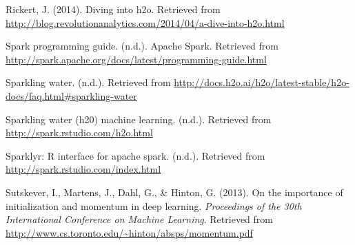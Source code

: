 \documentclass[12pt,twoside]{amherstthesis}
\begin{document}
  \hypertarget{ref-JVM}{}
  Rickert, J. (2014). Diving into h2o. Retrieved from
  \url{http://blog.revolutionanalytics.com/2014/04/a-dive-into-h2o.html}
  
  \hypertarget{ref-RDD}{}
  Spark programming guide. (n.d.). Apache Spark. Retrieved from
  \url{http://spark.apache.org/docs/latest/programming-guide.html}
  
  \hypertarget{ref-Sparklingh2oDoc}{}
  Sparkling water. (n.d.). Retrieved from
  \url{http://docs.h2o.ai/h2o/latest-stable/h2o-docs/faq.html\#sparkling-water}
  
  \hypertarget{ref-SparklingWaterML}{}
  Sparkling water (h20) machine learning. (n.d.). Retrieved from
  \url{http://spark.rstudio.com/h2o.html}
  
  \hypertarget{ref-SparklingWaterOverview}{}
  Sparklyr: R interface for apache spark. (n.d.). Retrieved from
  \url{http://spark.rstudio.com/index.html}
  
  \hypertarget{ref-momentum}{}
  Sutskever, I., Martens, J., Dahl, G., \& Hinton, G. (2013). On the
  importance of initialization and momentum in deep learning.
  \emph{Proceedings of the 30th International Conference on Machine
  Learning}. Retrieved from
  \url{http://www.cs.toronto.edu/~hinton/absps/momentum.pdf}


\end{document}
